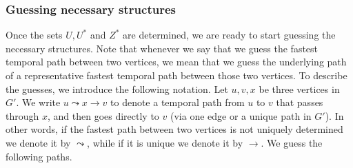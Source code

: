 \documentclass[a4paper,UKenglish,cleveref, autoref, thm-restate]{lipics-v2021}
\begin{document}
\subsubsection{Guessing necessary structures \label{sec:FPT-guessing}}
Once the sets $U, U^*$ and $Z^*$ are determined, we are ready to start guessing  the necessary structures.
Note that whenever we say that we guess the fastest temporal path between two vertices, we mean that we guess the underlying path of a representative fastest temporal path between those two vertices.
To describe the guesses, we introduce the following notation. Let $u,v,x$ be three vertices in $G'$. We write $u \leadsto x \rightarrow v$ to denote a temporal path from $u$ to $v$ that passes through $x$, and then goes directly to $v$ (via one edge or a unique path in $G'$). 
In other words, if the fastest path between two vertices is not uniquely determined we denote it by $\leadsto$, while if it is unique we denote it by $\rightarrow$.
%
We guess the following paths.
\end{document}
